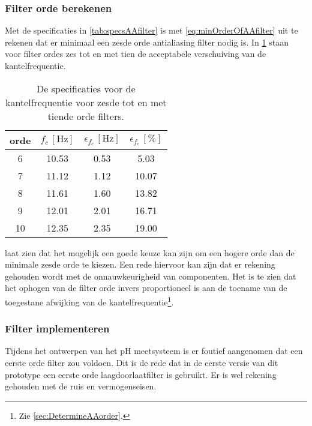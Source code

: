 \subsubsection{Filter orde berekenen}
Met de specificaties in \cref{tab:specsAAfilter} is met \cref{eq:minOrderOfAAfilter} uit te rekenen dat er minimaal een zesde orde antialiasing filter nodig is. In \cref{tab:AA3dBspecs} staan voor filter ordes zes tot en met tien de acceptabele verschuiving van de kantelfrequentie.
\begin{table}[!htb]
    \centering
    \begin{tabular}{c|c|c|c}
        orde & $f_c\,[\si{\hertz}]$ & $\epsilon_{f_c}\,[\si{\hertz}]$ & $\epsilon_{f_c}\,[\%]$ \\\hline
        6    & 10.53 & 0.53 & 5.03  \\
        7    & 11.12 & 1.12 & 10.07 \\
        8    & 11.61 & 1.60 & 13.82 \\
        9    & 12.01 & 2.01 & 16.71 \\
        10   & 12.35 & 2.35 & 19.00 \\
    \end{tabular}
    \caption{De specificaties voor de kantelfrequentie voor zesde tot en met tiende orde filters.}
    \label{tab:AA3dBspecs}
\end{table}
 laat zien dat het mogelijk een goede keuze kan zijn om een hogere orde dan de minimale zesde orde te kiezen. Een rede hiervoor kan zijn dat er rekening gehouden wordt met de onnauwkeurigheid van componenten. Het is te zien dat het ophogen van de filter orde invers proportioneel is aan de toename van de toegestane afwijking van de kantelfrequentie\footnote{Zie \cref{sec:DetermineAAorder}.}.

\subsubsection{Filter implementeren} \label{sec:filterFout}
Tijdens het ontwerpen van het pH meetsysteem is er foutief aangenomen dat een eerste orde filter zou voldoen. Dit is de rede dat in de eerste versie van dit prototype een eerste orde laagdoorlaatfilter is gebruikt. Er is wel rekening gehouden met de ruis en vermogenseisen.

